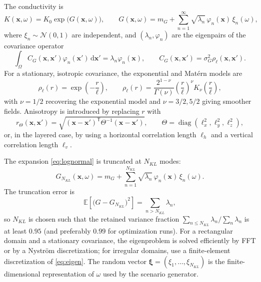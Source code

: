 \documentclass[11pt]{article}
\numberwithin{equation}{section}
\newcommand{\E}{\mathbb{E}}
\newcommand{\dd}{\,\mathrm{d}}
\newcommand{\xx}{\mathbf{x}}
\newcommand{\T}{\mathsf{T}}
\theoremstyle{plain}
\begin{document}
The conductivity is
\begin{equation}
\label{eq:lognormal}
K(\xx,\omega)=K_0\exp\bigl(G(\xx,\omega)\bigr),
\qquad
G(\xx,\omega)=m_G+\sum_{n=1}^{\infty}\sqrt{\lambda_n}\,\varphi_n(\xx)\,\xi_n(\omega),
\end{equation}
where $\xi_n\sim\mathcal{N}(0,1)$ are independent, and $(\lambda_n,\varphi_n)$
are the eigenpairs of the covariance operator
\begin{equation}
\label{eq:eigen}
\int_\Omega C_G(\xx,\xx')\varphi_n(\xx')\dd\xx'
=\lambda_n\varphi_n(\xx),
\qquad
C_G(\xx,\xx')=\sigma_G^2\rho_\ell(\xx,\xx').
\end{equation}
For a stationary, isotropic covariance, the exponential and Mat\'ern models are
\begin{equation}
\label{eq:covmodels}
\rho_\ell(r)=\exp\!\left(-\frac{r}{\ell}\right),
\qquad
\rho_\ell(r)=\frac{2^{1-\nu}}{\Gamma(\nu)}
\left(\frac{r}{\ell}\right)^{\nu}K_\nu\!\left(\frac{r}{\ell}\right),
\end{equation}
with $\nu=1/2$ recovering the exponential model and $\nu=3/2,5/2$ giving
smoother fields.  Anisotropy is introduced by replacing $r$ with
\begin{equation}
\label{eq:aniso}
r_\Theta(\xx,\xx')=
\sqrt{(\xx-\xx')^{\T}\Theta^{-1}(\xx-\xx')},
\qquad
\Theta=\operatorname{diag}(\ell_x^2,\ell_y^2,\ell_z^2),
\end{equation}
or, in the layered case, by using a horizontal correlation length $\ell_h$ and
a vertical correlation length $\ell_v$.

The expansion \eqref{eq:lognormal} is truncated at $N_{KL}$ modes:
\begin{equation}
\label{eq:KLtrunc}
G_{N_{KL}}(\xx,\omega)
=m_G+\sum_{n=1}^{N_{KL}}\sqrt{\lambda_n}\,\varphi_n(\xx)\,\xi_n(\omega).
\end{equation}
The truncation error is
\begin{equation}
\label{eq:KLerror}
\E\left[\bigl(G-G_{N_{KL}}\bigr)^2\right]
=\sum_{n>N_{KL}}\lambda_n,
\end{equation}
so $N_{KL}$ is chosen such that the retained variance fraction
$\sum_{n\le N_{KL}}\lambda_n/\sum_n\lambda_n$ is at least $0.95$ (and
preferably $0.99$ for optimization runs).  For a rectangular domain and a
stationary covariance, the eigenproblem is solved efficiently by FFT or by a
Nystr\"om discretization; for irregular domains, use a finite-element
discretization of \eqref{eq:eigen}.  The random vector
$\bm{\xi}=(\xi_1,\dots,\xi_{N_{KL}})$ is the finite-dimensional representation
of $\omega$ used by the scenario generator.
\end{document}
